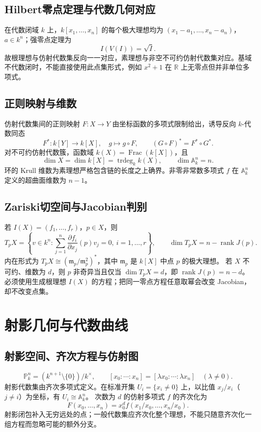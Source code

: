 \documentclass[../main.tex]{subfiles}
\begin{document}
\subsection{Hilbert零点定理与代数几何对应}
在代数闭域 $k$ 上，$k[x_1,\ldots,x_n]$ 的每个极大理想均为 $(x_1-a_1,\ldots,x_n-a_n)$，$a\in k^n$；强零点定理为
\[
I(V(I))=\sqrt I.
\]
故根理想与仿射代数集反向一一对应，素理想与非空不可约仿射代数集对应。基域不代数闭时，不能直接使用此点集形式，例如 $x^2+1$ 在 $\mathbb R$ 上无零点但并非单位多项式。
\subsection{正则映射与维数}
仿射代数集间的正则映射 $F:X\to Y$ 由坐标函数的多项式限制给出，诱导反向 $k$-代数同态
\[
F^*:k[Y]\to k[X],\quad g\mapsto g\circ F,
\qquad (G\circ F)^*=F^*\circ G^*.
\]
对不可约仿射代数簇，函数域 $k(X)=\operatorname{Frac}(k[X])$，且
\[
\dim X=\dim k[X]=\operatorname{trdeg}_k k(X),\qquad\dim\mathbb A_k^n=n.
\]
环的 Krull 维数为素理想严格包含链的长度之上确界。非零非常数多项式 $f$ 在 $\mathbb A_k^n$ 定义的超曲面维数为 $n-1$。
\subsection{Zariski切空间与Jacobian判别}
若 $I(X)=(f_1,\ldots,f_r)$，$p\in X$，则
\[
T_pX=\left\{v\in k^n:\sum_{j=1}^n\frac{\partial f_i}{\partial x_j}(p)v_j=0,
\ i=1,\ldots,r\right\},\qquad
\dim T_pX=n-\operatorname{rank}J(p).
\]
内在形式为 $T_pX\cong(\mathfrak m_p/\mathfrak m_p^2)^*$，其中 $\mathfrak m_p$ 是 $k[X]$ 中点 $p$ 的极大理想。
若 $X$ 不可约、维数为 $d$，则 $p$ 非奇异当且仅当 $\dim T_pX=d$，即 $\operatorname{rank}J(p)=n-d$。必须使用生成根理想 $I(X)$ 的方程；把同一零点方程任意取幂会改变 Jacobian，却不改变点集。
\section{射影几何与代数曲线}
\subsection{射影空间、齐次方程与仿射图}
\[
\mathbb P_k^n=(k^{n+1}\setminus\{0\})/k^\times,
\qquad [x_0:\cdots:x_n]=[\lambda x_0:\cdots:\lambda x_n]\quad(\lambda\ne0).
\]
射影代数集由齐次多项式定义。在标准开集 $U_i=\{x_i\ne0\}$ 上，以比值 $x_j/x_i$（$j\ne i$）为坐标，有 $U_i\cong\mathbb A_k^n$。
次数为 $d$ 的仿射多项式 $f$ 的齐次化为
\[
F(x_0,\ldots,x_n)=x_0^d f(x_1/x_0,\ldots,x_n/x_0).
\]
射影闭包补入无穷远处的点；一般代数集应齐次化整个理想，不能只随意齐次化一组方程而忽略可能的额外分支。
\end{document}
